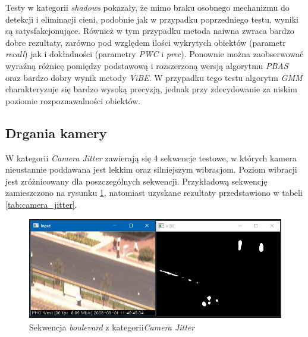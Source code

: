 Testy w kategorii \textit{shadows} pokazały, że mimo braku osobnego mechanizmu do detekcji i eliminacji cieni, podobnie jak w przypadku poprzedniego testu, wyniki są satysfakcjonujące. Również w tym przypadku metoda naiwna zwraca bardzo dobre rezultaty, zarówno pod względem ilości wykrytych obiektów (parametr \textit{recall}) jak i dokładności (parametry \textit{PWC} i \textit{prec}). Ponownie można zaobserwować wyraźną różnicę pomiędzy podstawową i rozszerzoną wersją algorytmu \textit{PBAS} oraz bardzo dobry wynik metody \textit{ViBE}. W przypadku tego testu algorytm \textit{GMM} charakteryzuje się bardzo wysoką precyzją, jednak przy zdecydowanie za niskim poziomie rozpoznawalności obiektów.

\subsection{Drgania kamery}
\label{subsec:drgania_kamery}

W kategorii \textit{Camera Jitter} zawierają się 4 sekwencje testowe, w których kamera nieustannie poddawana jest lekkim oraz silniejszym wibracjom. Poziom wibracji jest zróżnicowany dla poszczególnych sekwencji. Przykładową sekwencję zamieszczono na rysunku \ref{fig:jitter_example}, natomiast uzyskane rezultaty przedstawiono w tabeli \ref{tab:camera_jitter}. 

    \begin{figure}[h]
			\centering
			\includegraphics[scale=0.8]{img/5/jitter_example.png}
			\caption{Sekwencja \textit{boulevard} z kategorii\textit{Camera Jitter}}
			\label{fig:jitter_example}
	\end{figure}

